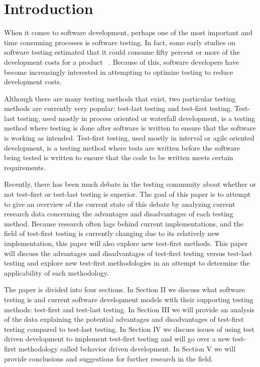 \documentclass{sig-alternate}
\begin{document}
\section{Introduction}
When it comes to software development, perhaps one of the most important and time consuming processes is software testing.  In fact, some early studies on software testing estimated that it could consume fifty percent or more of the development costs for a product ~\cite{Bertolino:2007}.  Because of this, software developers have become increasingly interested in attempting to optimize testing to reduce development costs.

Although there are many testing methods that  exist, two particular testing methods are currently very popular: test-last testing and test-first testing.  Test-last testing, used mostly in process oriented or waterfall development, is a testing method where testing is done after software is written to ensure that the software is working as intended.  Test-first testing, used mostly in interval or agile oriented development, is a testing method where tests are written before the software being tested is written to ensure that the code to be written meets certain requirements.

Recently, there has been much debate in the testing community about whether or not test-first or test-last testing is superior.  The goal of this paper is to attempt to give an overview of the current state of this debate by analyzing current research data concerning the advantages and disadvantages of each testing method.  Because research often lags behind current implementations, and the field of test-first testing is currently changing due to its relatively new implementation, this paper will also explore new test-first methods.  This paper will discuss the advantages and disadvantages of test-first testing versus test-last testing and explore new test-first methodologies in an attempt to determine the applicability of each methodology.

The paper is divided into four sections.  In Section II we discuss what software testing is and current software development models with their supporting testing methods: test-first and test-last testing.  In Section III we will provide an analysis of the data explaining the potential advantages and disadvantages of test-first testing compared to test-last testing.  In Section IV we discuss issues of using test driven development to implement test-first testing and will go over a new test-first methodology called behavior driven development. In Section V we will provide conclusions and suggestions for further research in the field.
\end{document}
